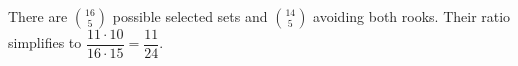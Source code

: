 There are $\binom{16}5$ possible selected sets and $\binom{14}5$ avoiding both rooks. Their ratio simplifies to $\dfrac{11\cdot10}{16\cdot15}=\boxed{\dfrac{11}{24}}$.
